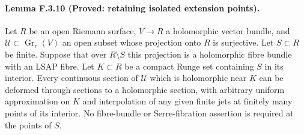 \paragraph{Lemma F.3.10 (Proved: retaining isolated extension points).}
Let $R$ be an open Riemann surface, $V\to R$ a holomorphic vector
bundle, and $\mathscr U\subset\operatorname{Gr}_r(V)$ an open
subset whose projection onto $R$ is surjective.  Let $S\subset R$
be finite.  Suppose that over $R\setminus S$ this projection is
a holomorphic fibre bundle with an LSAP fibre.  Let $K\subset R$
be a compact Runge set containing $S$ in its interior.
Every continuous section of $\mathscr U$ which is holomorphic
near $K$ can be deformed through sections to a holomorphic
section, with arbitrary uniform approximation on $K$ and
interpolation of any given finite jets at finitely many points
of its interior.  No fibre-bundle or Serre-fibration assertion
is required at the points of $S$.


